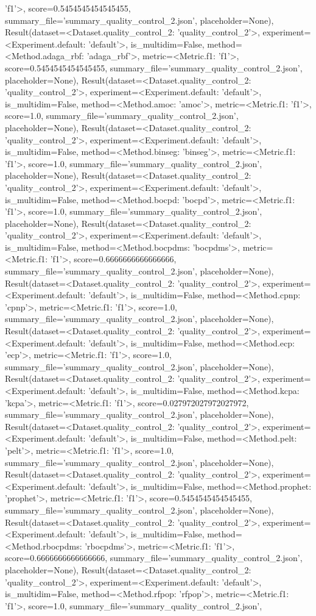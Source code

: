 'f1'>, score=0.5454545454545455, summary_file='summary_quality_control_2.json', placeholder=None), Result(dataset=<Dataset.quality_control_2: 'quality_control_2'>, experiment=<Experiment.default: 'default'>, is_multidim=False, method=<Method.adaga_rbf: 'adaga_rbf'>, metric=<Metric.f1: 'f1'>, score=0.5454545454545455, summary_file='summary_quality_control_2.json', placeholder=None), Result(dataset=<Dataset.quality_control_2: 'quality_control_2'>, experiment=<Experiment.default: 'default'>, is_multidim=False, method=<Method.amoc: 'amoc'>, metric=<Metric.f1: 'f1'>, score=1.0, summary_file='summary_quality_control_2.json', placeholder=None), Result(dataset=<Dataset.quality_control_2: 'quality_control_2'>, experiment=<Experiment.default: 'default'>, is_multidim=False, method=<Method.binseg: 'binseg'>, metric=<Metric.f1: 'f1'>, score=1.0, summary_file='summary_quality_control_2.json', placeholder=None), Result(dataset=<Dataset.quality_control_2: 'quality_control_2'>, experiment=<Experiment.default: 'default'>, is_multidim=False, method=<Method.bocpd: 'bocpd'>, metric=<Metric.f1: 'f1'>, score=1.0, summary_file='summary_quality_control_2.json', placeholder=None), Result(dataset=<Dataset.quality_control_2: 'quality_control_2'>, experiment=<Experiment.default: 'default'>, is_multidim=False, method=<Method.bocpdms: 'bocpdms'>, metric=<Metric.f1: 'f1'>, score=0.6666666666666666, summary_file='summary_quality_control_2.json', placeholder=None), Result(dataset=<Dataset.quality_control_2: 'quality_control_2'>, experiment=<Experiment.default: 'default'>, is_multidim=False, method=<Method.cpnp: 'cpnp'>, metric=<Metric.f1: 'f1'>, score=1.0, summary_file='summary_quality_control_2.json', placeholder=None), Result(dataset=<Dataset.quality_control_2: 'quality_control_2'>, experiment=<Experiment.default: 'default'>, is_multidim=False, method=<Method.ecp: 'ecp'>, metric=<Metric.f1: 'f1'>, score=1.0, summary_file='summary_quality_control_2.json', placeholder=None), Result(dataset=<Dataset.quality_control_2: 'quality_control_2'>, experiment=<Experiment.default: 'default'>, is_multidim=False, method=<Method.kcpa: 'kcpa'>, metric=<Metric.f1: 'f1'>, score=0.027972027972027972, summary_file='summary_quality_control_2.json', placeholder=None), Result(dataset=<Dataset.quality_control_2: 'quality_control_2'>, experiment=<Experiment.default: 'default'>, is_multidim=False, method=<Method.pelt: 'pelt'>, metric=<Metric.f1: 'f1'>, score=1.0, summary_file='summary_quality_control_2.json', placeholder=None), Result(dataset=<Dataset.quality_control_2: 'quality_control_2'>, experiment=<Experiment.default: 'default'>, is_multidim=False, method=<Method.prophet: 'prophet'>, metric=<Metric.f1: 'f1'>, score=0.5454545454545455, summary_file='summary_quality_control_2.json', placeholder=None), Result(dataset=<Dataset.quality_control_2: 'quality_control_2'>, experiment=<Experiment.default: 'default'>, is_multidim=False, method=<Method.rbocpdms: 'rbocpdms'>, metric=<Metric.f1: 'f1'>, score=0.6666666666666666, summary_file='summary_quality_control_2.json', placeholder=None), Result(dataset=<Dataset.quality_control_2: 'quality_control_2'>, experiment=<Experiment.default: 'default'>, is_multidim=False, method=<Method.rfpop: 'rfpop'>, metric=<Metric.f1: 'f1'>, score=1.0, summary_file='summary_quality_control_2.json', 